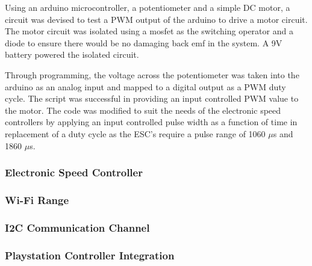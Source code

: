 	  Using an arduino microcontroller, a potentiometer and a simple DC motor, a circuit was devised to test a PWM output of the arduino to drive a motor circuit. The motor circuit was isolated using a mosfet as the switching operator and a diode to ensure there would be no damaging back emf in the system. A 9V battery powered the isolated circuit.
  
  Through programming, the voltage across the potentiometer was taken into the arduino as an analog input and mapped to a digital output as a PWM duty cycle. The script was successful in providing an input controlled PWM value to the motor. The code was modified to suit the needs of the electronic speed controllers by applying an input controlled pulse width as a function of time in replacement of a duty cycle as the ESC's require a pulse range of 1060 $\mu$s and 1860 $\mu$s.
  
  \subsubsection{Electronic Speed Controller}
  
  \subsubsection{Wi-Fi Range}
  
  \subsubsection{I2C Communication Channel}
  
  \subsubsection{Playstation Controller Integration}
